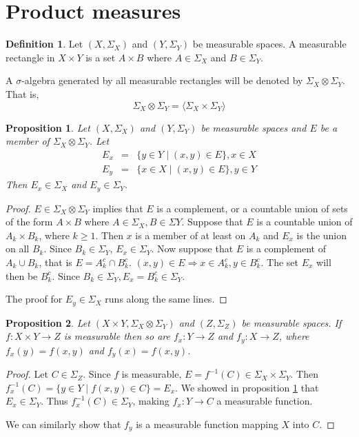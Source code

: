 \documentclass{article}
\theoremstyle{plain}
\numberwithin{thm}{section}
\theoremstyle{plain}
\newtheorem{prop}{Proposition}
\numberwithin{prop}{section}
\theoremstyle{definition}
\newtheorem{defn}{Definition}
\numberwithin{defn}{section}
\theoremstyle{remark}
\theoremstyle{plain}
\numberwithin{cor}{section}
\numberwithin{equation}{section}
\begin{document}
\section{Product measures}\label{s6}
\begin{defn}\label{s6d1}
Let $(X, \Sigma_X)$ and $(Y, \Sigma_Y)$ be measurable spaces. A measurable 
rectangle in $X \times Y$ is a set $A \times B$ where $A \in \Sigma_X$ and $B
\in \Sigma_Y$.

A $\sigma$-algebra generated by all measurable rectangles will be denoted by
$\Sigma_X \otimes \Sigma_Y$. That is,
\[
\Sigma_X \otimes \Sigma_Y = \langle\Sigma_X\times\Sigma_Y\rangle
\]
\end{defn}

\begin{prop}\label{s6p1}
Let $(X, \Sigma_X)$ and $(Y, \Sigma_Y)$ be measurable spaces and $E$ be a member
of $\Sigma_X \otimes \Sigma_Y$. Let 
\begin{eqnarray*}
E_x &=& \{y \in Y \;|\; (x, y) \in E\}, x \in X \\
E_y &=& \{x \in X \;|\; (x, y) \in E\}, y \in Y 
\end{eqnarray*}
Then $E_x \in \Sigma_X$ and $E_y \in \Sigma_Y$.
\end{prop}
\begin{proof}
$E \in \Sigma_X \otimes \Sigma_Y$ implies that $E$ is a complement,
or a countable union of sets of the form $A \times B$ where $A \in \Sigma_X, B
\in \Sigma Y$. Suppose that $E$ is a countable union of $A_k \times B_k$, where
$k \ge 1$. Then $x$ is a member of at least on $A_k$ and $E_x$ is the union on
all $B_k$. Since $B_k \in \Sigma_Y$, $E_x \in \Sigma_Y$. Now suppose that $E$ is
a complement of $A_k \cup B_k$, that is $E = A_k^c \cap B_k^c$. $(x, y) \in E
\Rightarrow x \in A_k^c, y \in B_k^c$. The set $E_x$ will then be $B_k^c$. Since
$B_k \in \Sigma_Y, E_x = B_k^c \in \Sigma_Y$.

The proof for $E_y \in \Sigma_X$ runs along the same lines.
\end{proof}

\begin{prop}\label{s6p2}
Let $(X \times Y, \Sigma_X \otimes \Sigma_Y)$ and $(Z, \Sigma_Z)$ be measurable
spaces. If $f: X \times Y \rightarrow Z$ is measurable then so are $f_x: Y 
\rightarrow Z$ and $f_y: X \rightarrow Z$, where $f_x(y) = f(x, y)$ and $f_y(x)
= f(x, y)$.
\end{prop}
\begin{proof}
Let $C \in \Sigma_Z$. Since $f$ is measurable, $E = f^{-1}(C) \in \Sigma_X 
\times \Sigma_Y$. Then $f_x^{-1}(C) = \{y \in Y \;|\; f(x, y) \in C\} = E_x$.
We showed in proposition \ref{s6p1} that $E_x \in \Sigma_Y$. Thus $f_x^{-1}(C)
\in \Sigma_Y$, making $f_x: Y \rightarrow C$ a measurable function.

We can similarly show that $f_y$ is a measurable function mapping $X$ into $C$.
\end{proof}
\end{document}
